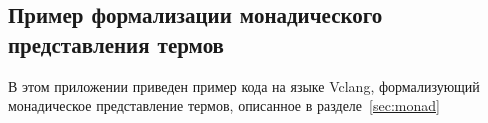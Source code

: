 \begin{appendices}

\section{Пример формализации монадического представления термов}
\label{apendix:monad}
В этом приложении приведен пример кода на языке Vclang, формализующий монадическое представление термов, описанное в разделе~\ref{sec:monad}
\inputminted[breaklines=true, fontsize=\scriptsize]{haskell}{code/properties.hs}

\end{appendices}
